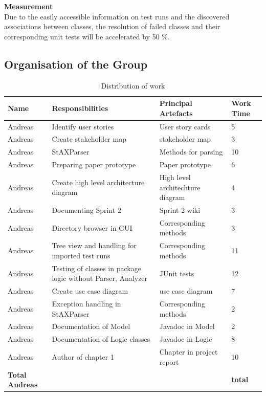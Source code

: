 \large\textbf{Measurement}\\ 
Due to the easily accessible information on test runs and the discovered associations between classes, the resolution of failed classes and their corresponding unit tests will be accelerated by 50 \%. 

\newpage
\subsection{Organisation of the Group}

\begin{table}[!h]
  \caption{Distribution of work}
  \centering
  \begin{tabular}{p{2cm}||p{4.2cm}|p{4cm}|l|}
    Name & Responsibilities & Principal Artefacts & Work Time\\
    \hline
    \hline
    Andreas & Identify user stories & User story cards & 5 \\
    \hline
    Andreas & Create stakeholder map & stakeholder map & 3 \\ 
    \hline
    Andreas & StAXParser & Methods for parsing & 10 \\ 
    \hline
    Andreas & Preparing paper prototype & Paper prototype & 6 \\
    \hline
    Andreas & Create high level architecture diagram & High level architechture diagram & 4 \\ 
    \hline
    Andreas & Documenting Sprint 2 & Sprint 2 wiki & 3 \\ 
    \hline 
    Andreas & Directory browser in GUI & Corresponding methods & 3 \\ 
    \hline
    Andreas & Tree view and handling for imported test runs & Corresponding methods & 11 \\ 
    \hline
    Andreas & Testing of classes in package logic without Parser, Analyzer & JUnit tests & 12 \\ 
    \hline 
    Andreas & Create use case diagram & use case diagram & 7 \\ 
    \hline
    Andreas & Exception handling in StAXParser & Corresponding methods & 2 \\ 
    \hline
    Andreas & Documentation of Model & Javadoc in Model & 2 \\ 
    \hline
    Andreas & Documentation of Logic classes & Javadoc in Logic & 8 \\ 
    \hline
    Andreas & Author of chapter 1 & Chapter in project report & 10 \\ 
    \hline
    \hline 
    \textbf{Total \newline Andreas} & & & \textbf{total}   \\
    \hline
    \hline
  \end{tabular}
\end{table}

